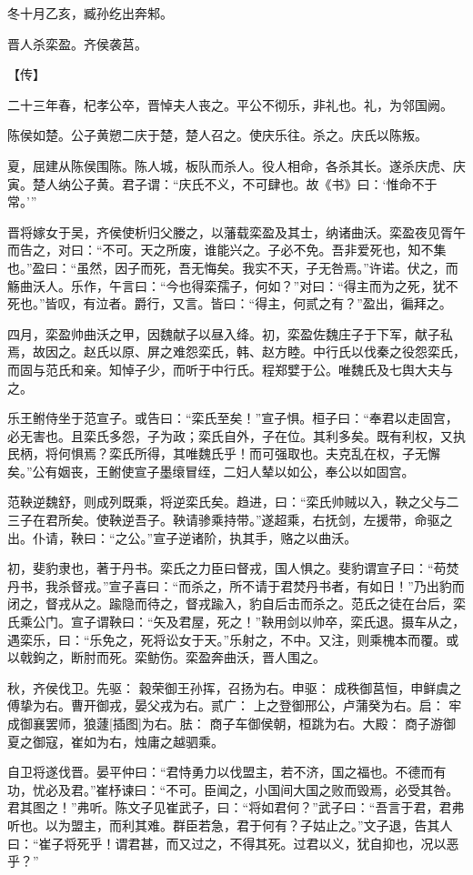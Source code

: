 \documentclass[a4paper,12pt,UTF8,twoside]{ctexbook}
\begin{document}
冬十月乙亥，臧孙纥出奔邾。

晋人杀栾盈。齐侯袭莒。

【传】

二十三年春，杞孝公卒，晋悼夫人丧之。平公不彻乐，非礼也。礼，为邻国阙。

陈侯如楚。公子黄愬二庆于楚，楚人召之。使庆乐往。杀之。庆氏以陈叛。

夏，屈建从陈侯围陈。陈人城，板队而杀人。役人相命，各杀其长。遂杀庆虎、庆寅。楚人纳公子黄。君子谓：“庆氏不义，不可肆也。故《书》曰：‘惟命不于常。’”

晋将嫁女于吴，齐侯使析归父媵之，以藩载栾盈及其士，纳诸曲沃。栾盈夜见胥午而告之，对曰：“不可。天之所废，谁能兴之。子必不免。吾非爱死也，知不集也。”盈曰：“虽然，因子而死，吾无悔矣。我实不天，子无咎焉。”许诺。伏之，而觞曲沃人。乐作，午言曰：“今也得栾孺子，何如？”对曰：“得主而为之死，犹不死也。”皆叹，有泣者。爵行，又言。皆曰：“得主，何贰之有？”盈出，徧拜之。

四月，栾盈帅曲沃之甲，因魏献子以昼入绛。初，栾盈佐魏庄子于下军，献子私焉，故因之。赵氏以原、屏之难怨栾氏，韩、赵方睦。中行氏以伐秦之役怨栾氏，而固与范氏和亲。知悼子少，而听于中行氏。程郑嬖于公。唯魏氏及七舆大夫与之。

乐王鲋侍坐于范宣子。或告曰：“栾氏至矣！”宣子惧。桓子曰：“奉君以走固宫，必无害也。且栾氏多怨，子为政；栾氏自外，子在位。其利多矣。既有利权，又执民柄，将何惧焉？栾氏所得，其唯魏氏乎！而可强取也。夫克乱在权，子无懈矣。”公有姻丧，王鲋使宣子墨缞冒绖，二妇人辇以如公，奉公以如固宫。

范鞅逆魏舒，则成列既乘，将逆栾氏矣。趋进，曰：“栾氏帅贼以入，鞅之父与二三子在君所矣。使鞅逆吾子。鞅请骖乘持带。”遂超乘，右抚剑，左援带，命驱之出。仆请，鞅曰：“之公。”宣子逆诸阶，执其手，赂之以曲沃。

初，斐豹隶也，著于丹书。栾氏之力臣曰督戎，国人惧之。斐豹谓宣子曰：“苟焚丹书，我杀督戎。”宣子喜曰：“而杀之，所不请于君焚丹书者，有如日！”乃出豹而闭之，督戎从之。踰隐而待之，督戎踰入，豹自后击而杀之。范氏之徒在台后，栾氏乘公门。宣子谓鞅曰：“矢及君屋，死之！”鞅用剑以帅卒，栾氏退。摄车从之，遇栾乐，曰：“乐免之，死将讼女于天。”乐射之，不中。又注，则乘槐本而覆。或以戟鉤之，断肘而死。栾鲂伤。栾盈奔曲沃，晋人围之。

秋，齐侯伐卫。先驱： 穀荣御王孙挥，召扬为右。申驱： 成秩御莒恒，申鲜虞之傅挚为右。曹开御戎，晏父戎为右。贰广： 上之登御邢公，卢蒲癸为右。启： 牢成御襄罢师，狼蘧[插图]为右。胠： 商子车御侯朝，桓跳为右。大殿： 商子游御夏之御寇，崔如为右，烛庸之越驷乘。

自卫将遂伐晋。晏平仲曰：“君恃勇力以伐盟主，若不济，国之福也。不德而有功，忧必及君。”崔杼谏曰：“不可。臣闻之，小国间大国之败而毁焉，必受其咎。君其图之！”弗听。陈文子见崔武子，曰：“将如君何？”武子曰：“吾言于君，君弗听也。以为盟主，而利其难。群臣若急，君于何有？子姑止之。”文子退，告其人曰：“崔子将死乎！谓君甚，而又过之，不得其死。过君以义，犹自抑也，况以恶乎？”
\end{document}
